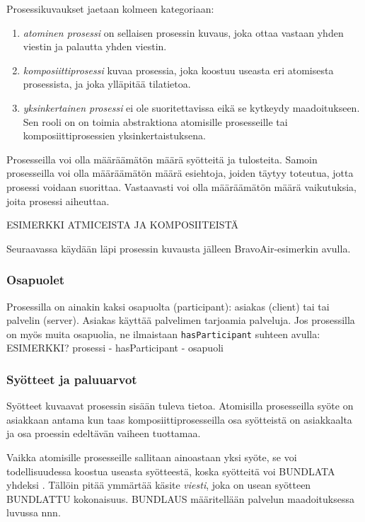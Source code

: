 \documentclass[finnish]{tktltiki2}
\theoremstyle{definition}
\theoremstyle{remark}
\begin{document}
Prosessikuvaukset jaetaan kolmeen kategoriaan\cite{OWLS}:
\begin{enumerate}
\item \textit{atominen prosessi} on sellaisen prosessin kuvaus, joka ottaa vastaan yhden viestin ja palautta yhden viestin. 
\item \textit{komposiittiprosessi} kuvaa prosessia, joka koostuu useasta eri atomisesta prosessista, ja joka ylläpitää tilatietoa. 
\item \textit{yksinkertainen prosessi} ei ole suoritettavissa eikä se kytkeydy maadoitukseen. Sen rooli on on toimia abstraktiona atomisille prosesseille tai komposiittiprosessien yksinkertaistuksena. 
\end{enumerate}

Prosesseilla voi olla määräämätön määrä syötteitä ja tulosteita. Samoin prosesseilla voi olla määräämätön määrä esiehtoja, joiden täytyy toteutua, jotta prosessi voidaan suorittaa. Vastaavasti voi olla määräämätön määrä vaikutuksia, joita prosessi aiheuttaa\cite{OWLS}.

ESIMERKKI ATMICEISTA JA KOMPOSIITEISTÄ

Seuraavassa käydään läpi prosessin kuvausta jälleen BravoAir-esimerkin\cite{daml} avulla.

\subsubsection{Osapuolet}

Prosessilla on ainakin kaksi osapuolta (participant): asiakas (client) tai tai palvelin (server). Asiakas käyttää palvelimen tarjoamia palveluja\cite{OWLS}.
Jos prosessilla on myös muita osapuolia, ne ilmaistaan \texttt{hasParticipant} suhteen avulla:
ESIMERKKI? prosessi - hasParticipant - osapuoli

\subsubsection{Syötteet ja paluuarvot}

Syötteet kuvaavat prosessin sisään tuleva tietoa\cite{OWLS}. Atomisilla prosesseilla syöte on asiakkaan antama kun taas komposiittiprosesseilla osa syötteistä on asiakkaalta ja osa proessin edeltävän vaiheen tuottamaa. 

Vaikka atomisille prosesseille sallitaan ainoastaan yksi syöte, se voi todellisuudessa koostua useasta syötteestä, koska syötteitä voi BUNDLATA yhdeksi \cite{OWLS}. Tällöin pitää ymmärtää käsite \textit{viesti}, joka on usean syötteen BUNDLATTU kokonaisuus. BUNDLAUS määritellään palvelun maadoituksessa luvussa nnn. 
\end{document}
